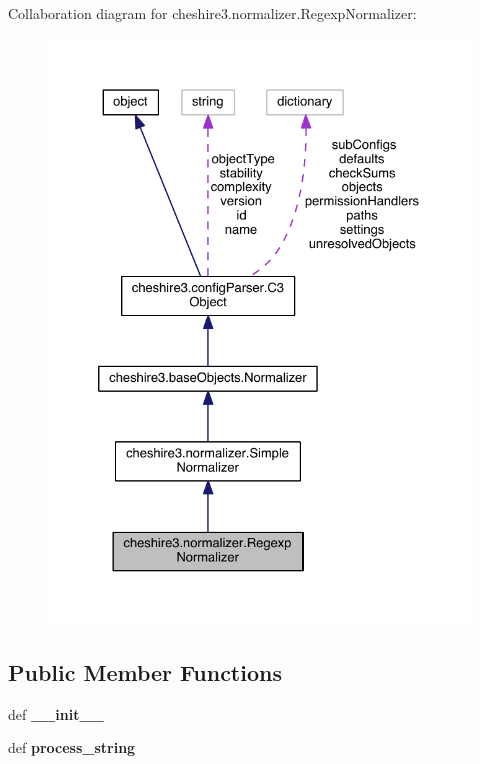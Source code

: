 Collaboration diagram for cheshire3.\-normalizer.\-Regexp\-Normalizer\-:
\nopagebreak
\begin{figure}[H]
\begin{center}
\leavevmode
\includegraphics[width=328pt]{classcheshire3_1_1normalizer_1_1_regexp_normalizer__coll__graph}
\end{center}
\end{figure}
\subsection*{Public Member Functions}
\begin{DoxyCompactItemize}
\item 
\hypertarget{classcheshire3_1_1normalizer_1_1_regexp_normalizer_ab3ca54f61078a936cb2fafbb42e64e8f}{def {\bfseries \-\_\-\-\_\-init\-\_\-\-\_\-}}\label{classcheshire3_1_1normalizer_1_1_regexp_normalizer_ab3ca54f61078a936cb2fafbb42e64e8f}

\item 
\hypertarget{classcheshire3_1_1normalizer_1_1_regexp_normalizer_a60bbe46a53dfb28359d9ab332ddafae7}{def {\bfseries process\-\_\-string}}\label{classcheshire3_1_1normalizer_1_1_regexp_normalizer_a60bbe46a53dfb28359d9ab332ddafae7}

\end{DoxyCompactItemize}
